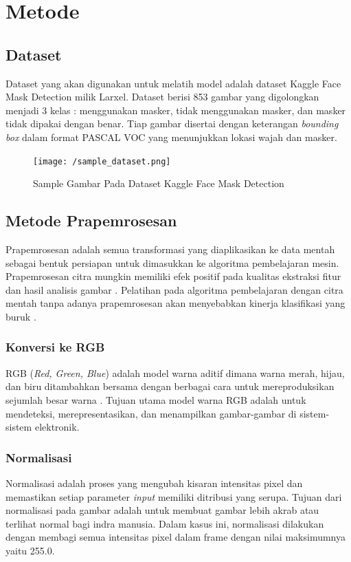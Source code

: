 \documentclass{article}
\begin{document}
  \section{Metode}
  	\subsection{Dataset}
  	Dataset yang akan digunakan untuk melatih model adalah dataset Kaggle Face Mask Detection milik Larxel\cite{larxel_2020}. Dataset berisi 853 gambar yang digolongkan menjadi 3 kelas : menggunakan masker, tidak menggunakan masker, dan masker tidak dipakai dengan benar. Tiap gambar disertai dengan keterangan \textit{bounding box} dalam format PASCAL VOC yang menunjukkan lokasi wajah dan masker. 
  	
  	\begin{figure}[H]
  		\centering
  		\texttt{[image: /sample\_dataset.png]}
  		\caption{Sample Gambar Pada Dataset Kaggle Face Mask Detection}
  	\end{figure} 
  	
  	\subsection{Metode Prapemrosesan}
  	Prapemrosesan adalah semua transformasi yang diaplikasikan ke data mentah sebagai bentuk persiapan untuk dimasukkan ke algoritma pembelajaran mesin. Prapemrosesan citra mungkin memiliki efek positif pada kualitas ekstraksi fitur dan hasil analisis gambar \cite{krig}. Pelatihan pada algoritma pembelajaran dengan citra mentah tanpa adanya prapemrosesan akan menyebabkan kinerja klasifikasi yang buruk \cite{pal}.
	  	\subsubsection{Konversi ke RGB}
	  	RGB (\textit{Red, Green, Blue}) adalah model warna aditif dimana warna merah, hijau, dan biru ditambahkan bersama dengan berbagai cara untuk mereproduksikan sejumlah besar warna \cite{robert}. Tujuan utama model warna RGB adalah untuk mendeteksi, merepresentasikan, dan menampilkan gambar-gambar di sistem-sistem elektronik.
	  	\subsubsection{Normalisasi}
	  	Normalisasi adalah proses yang mengubah kisaran intensitas pixel dan memastikan setiap parameter \textit{input} memiliki ditribusi yang serupa. 
	  	Tujuan dari normalisasi pada gambar adalah untuk membuat gambar lebih akrab atau terlihat normal bagi indra manusia. Dalam kasus ini, normalisasi dilakukan dengan membagi semua intensitas pixel dalam frame dengan nilai maksimumnya yaitu 255.0.
\end{document}
